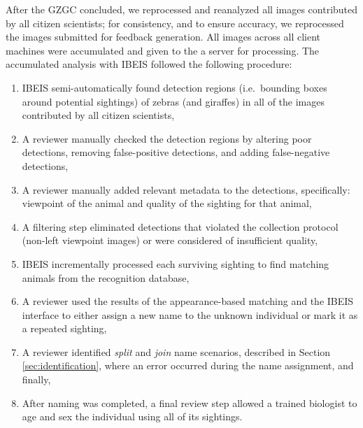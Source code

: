 
After the GZGC concluded, we reprocessed and reanalyzed all images contributed by all citizen scientists; for consistency, and to ensure accuracy, we reprocessed the images submitted for feedback generation.   All images across all client machines were accumulated and given to the a server for processing.  The accumulated analysis with IBEIS followed the following procedure:


\begin{enumerate}
	\item IBEIS semi-automatically found detection regions (i.e.\ bounding boxes around potential sightings) of zebras (and giraffes) in all of the images contributed by all citizen scientists,
	\item A reviewer manually checked the detection regions by altering poor detections, removing false-positive detections, and adding false-negative detections,
	\item A reviewer manually added relevant metadata to the detections, specifically: viewpoint of the animal and quality of the sighting for that animal,
	\item A filtering step eliminated detections that violated the collection protocol (non-left viewpoint images) or were considered of insufficient quality,
	\item IBEIS incrementally processed each surviving sighting to find matching animals from the recognition database,
	\item A reviewer used the results of the appearance-based matching and the IBEIS interface to either assign a new name to the unknown individual or mark it as a repeated sighting,
	\item A reviewer identified \textit{split} and \textit{join} name scenarios, described in Section \ref{sec:identification}, where an error occurred during the name assignment, and finally,
	\item After naming was completed, a final review step allowed a trained biologist to age and sex the individual using all of its sightings.
\end{enumerate}

